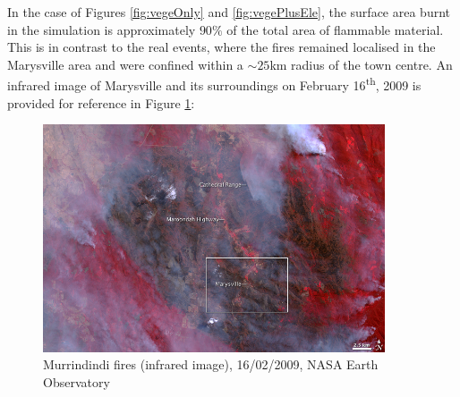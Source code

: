\noindent In the case of Figures \ref{fig:vegeOnly} and \ref{fig:vegePlusEle}, the surface area burnt in the simulation is approximately $90\%$ of the total area of flammable material. This is in contrast to the real events, where the fires remained localised in the Marysville area and were confined  within a $\sim 25$km radius of the town centre. An infrared image of Marysville and its surroundings on February 16\textsuperscript{th}, 2009 is provided for reference in Figure \ref{fig:realData}:

\begin{figure}[h!]
    \centering
    \includegraphics[width=0.9\textwidth]{Figures/realFire.jpg}
    \caption{Murrindindi fires (infrared image), 16/02/2009, NASA Earth Observatory \cite{NASA}}
    \label{fig:realData}
\end{figure}

